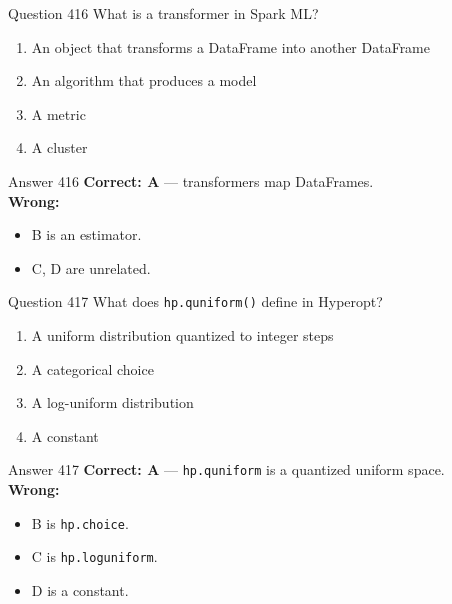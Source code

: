 \documentclass[aspectratio=169,11pt]{beamer}
\begin{document}
	\begin{frame}{Question 416}
		What is a transformer in Spark ML?
		\begin{enumerate}[label=\Alph*.]
			\item An object that transforms a DataFrame into another DataFrame
			\item An algorithm that produces a model
			\item A metric
			\item A cluster
		\end{enumerate}
	\end{frame}
	\begin{frame}{Answer 416}
		\textbf{Correct: A} --- transformers map DataFrames.\\
		\vspace{0.5em}
		\textbf{Wrong:}
		\begin{itemize}
			\item B is an estimator.
			\item C, D are unrelated.
		\end{itemize}
	\end{frame}
	
	\begin{frame}{Question 417}
		What does \texttt{hp.quniform()} define in Hyperopt?
		\begin{enumerate}[label=\Alph*.]
			\item A uniform distribution quantized to integer steps
			\item A categorical choice
			\item A log-uniform distribution
			\item A constant
		\end{enumerate}
	\end{frame}
	\begin{frame}{Answer 417}
		\textbf{Correct: A} --- \texttt{hp.quniform} is a quantized uniform space.\\
		\vspace{0.5em}
		\textbf{Wrong:}
		\begin{itemize}
			\item B is \texttt{hp.choice}.
			\item C is \texttt{hp.loguniform}.
			\item D is a constant.
		\end{itemize}
	\end{frame}
	
\end{document}
